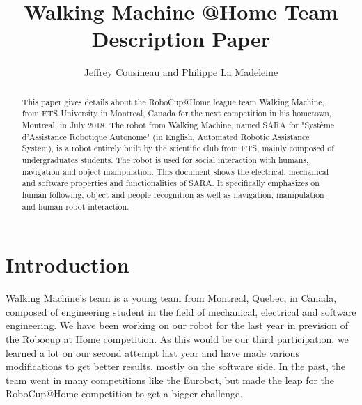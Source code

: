 \documentclass[runningheads,a4paper]{llncs}
\begin{document}
\newif\ifdraft
\draftfalse

\title{Walking Machine @Home \newline {} Team Description Paper}

\author{Jeffrey Cousineau and Philippe La Madeleine}
\maketitle



\begin{abstract}

This paper gives details about the RoboCup@Home league team Walking Machine, from ETS University in Montreal, Canada for the next competition in his hometown, Montreal, in July 2018. The robot from Walking Machine, named SARA for "Système d’Assistance Robotique Autonome" (in English, Automated Robotic Assistance System), is a robot entirely built by the scientific club from ETS, mainly composed of undergraduates students. The robot is used for social interaction with humans, navigation and object manipulation. This document shows the electrical, mechanical and software properties and functionalities of SARA. It specifically emphasizes on human following, object and people recognition as well as navigation, manipulation and human-robot interaction.

\end{abstract}


\section{Introduction}
\tab Walking Machine’s team is a young team from Montreal, Quebec, in Canada, composed of engineering student in the field of mechanical, electrical and software engineering. We have been working on our robot for the last year in prevision of the Robocup at Home competition. As this would be our third participation, we learned a lot on our second attempt last year and have made various modifications to get better results, mostly on the software side. In the past, the team went in many competitions like the Eurobot, but made the leap for the RoboCup@Home competition to get a bigger challenge. \\
\end{document}
